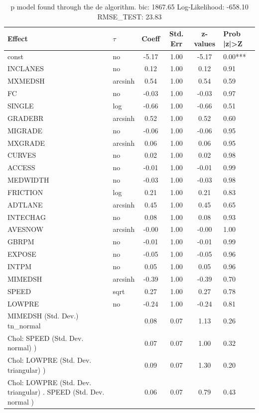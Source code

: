 \begin{table}
	\caption{p model found through the de algorithm. bic: 1867.65 Log-Likelihood: -658.10 RMSE_TEST: 23.83}
	\begin{center}
		\begin{tabular}{|l|l|c|c|c|l|}
			\hline
			Effect & $\tau$ & Coeff & Std. Err & z-values & Prob |z|>Z \\
			\hline
			const & no & -5.17 & 1.00 & -5.17 & 0.00*** \\
			\hline
			INCLANES & no & 0.12 & 1.00 & 0.12 & 0.91 \\
			\hline
			MXMEDSH & arcsinh & 0.54 & 1.00 & 0.54 & 0.59 \\
			\hline
			FC & no & -0.03 & 1.00 & -0.03 & 0.97 \\
			\hline
			SINGLE & log & -0.66 & 1.00 & -0.66 & 0.51 \\
			\hline
			GRADEBR & arcsinh & 0.52 & 1.00 & 0.52 & 0.60 \\
			\hline
			MIGRADE & no & -0.06 & 1.00 & -0.06 & 0.95 \\
			\hline
			MXGRADE & arcsinh & 0.06 & 1.00 & 0.06 & 0.95 \\
			\hline
			CURVES & no & 0.02 & 1.00 & 0.02 & 0.98 \\
			\hline
			ACCESS & no & -0.01 & 1.00 & -0.01 & 0.99 \\
			\hline
			MEDWIDTH & no & -0.03 & 1.00 & -0.03 & 0.98 \\
			\hline
			FRICTION & log & 0.21 & 1.00 & 0.21 & 0.83 \\
			\hline
			ADTLANE & arcsinh & 0.45 & 1.00 & 0.45 & 0.65 \\
			\hline
			INTECHAG & no & 0.08 & 1.00 & 0.08 & 0.93 \\
			\hline
			AVESNOW & arcsinh & -0.00 & 1.00 & -0.00 & 1.00 \\
			\hline
			GBRPM & no & -0.01 & 1.00 & -0.01 & 0.99 \\
			\hline
			EXPOSE & no & -0.05 & 1.00 & -0.05 & 0.96 \\
			\hline
			INTPM & no & 0.05 & 1.00 & 0.05 & 0.96 \\
			\hline
			MIMEDSH & arcsinh & -0.39 & 1.00 & -0.39 & 0.70 \\
			\hline
			SPEED & sqrt & 0.27 & 1.00 & 0.27 & 0.78 \\
			\hline
			LOWPRE & no & -0.24 & 1.00 & -0.24 & 0.81 \\
			\hline
			MIMEDSH (Std. Dev.) tn_normal &  & 0.08 & 0.07 & 1.13 & 0.26 \\
			\hline
			 Chol: SPEED (Std. Dev. normal) ) &  & 0.07 & 0.07 & 1.00 & 0.32 \\
			\hline
			 Chol: LOWPRE (Std. Dev. triangular) ) &  & 0.09 & 0.07 & 1.30 & 0.20 \\
			\hline
			 Chol: LOWPRE (Std. Dev. triangular) . SPEED (Std. Dev.   normal ) &  & 0.06 & 0.07 & 0.79 & 0.43 \\
			\hline
		\end{tabular}
	\end{center}
\end{table}